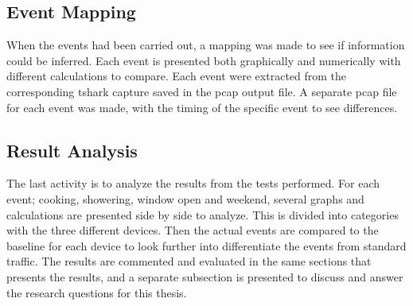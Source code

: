 \subsection{Event Mapping}
When the events had been carried out, a mapping was made to see if information could be inferred. Each event is presented both graphically and numerically with different calculations to compare. Each event were extracted from the corresponding tshark capture saved in the pcap output file. A separate pcap file for each event was made, with the timing of the specific event to see differences. 

\subsection{Result Analysis}
The last activity is to analyze the results from the tests performed. For each event; cooking, showering, window open and weekend, several graphs and calculations are presented side by side to analyze. This is divided into categories with the three different devices. Then the actual events are compared to the baseline for each device to look further into differentiate the events from standard traffic. The results are commented and evaluated in the same sections that presents the results, and a separate subsection is presented to discuss and answer the research questions for this thesis. 